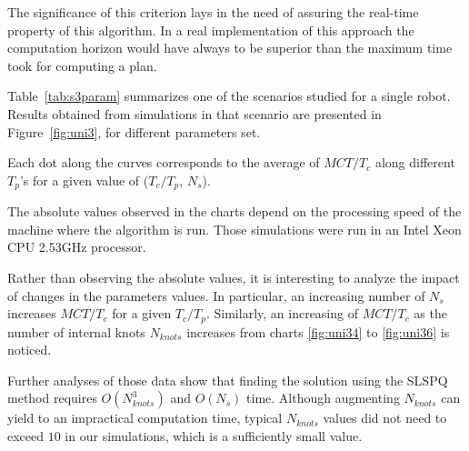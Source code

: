 The significance of this criterion lays in the need of assuring the 
real-time property of this algorithm.
In a real implementation of this approach the computation horizon would have 
always to be superior than the
maximum time took for computing a plan.


Table~\ref{tab:s3param} summarizes one of the scenarios studied for a 
single robot. Results obtained from simulations in 
that scenario are presented in Figure~\ref{fig:uni3}, for different parameters set.

Each dot along the curves corresponds to the average of $MCT/T_c$ along different $T_p$'s for a given value of ($T_c/T_p$, $N_s$).

The absolute values observed in the charts depend on the processing speed of the machine
where the algorithm is run. Those simulations were run in an Intel Xeon CPU 2.53GHz processor.

Rather than observing the absolute values, it is interesting to analyze the impact of 
changes in the parameters values. In particular, an increasing number of $N_s$ 
increases $MCT/T_c$ for a 
given $T_c/T_p$. Similarly, an increasing of $MCT/T_c$ as the number of
internal knots $N_{knots}$ increases from charts \ref{fig:uni34} to \ref{fig:uni36} is 
noticed.

Further analyses of those data show that finding the solution using the SLSPQ method
requires $O(N_{knots}^3)$ and $O(N_s)$ time. Although augmenting $N_{knots}$ can yield
to an impractical computation time, typical $N_{knots}$ values did not need to exceed $10$ in our simulations, which is a sufficiently small value.


